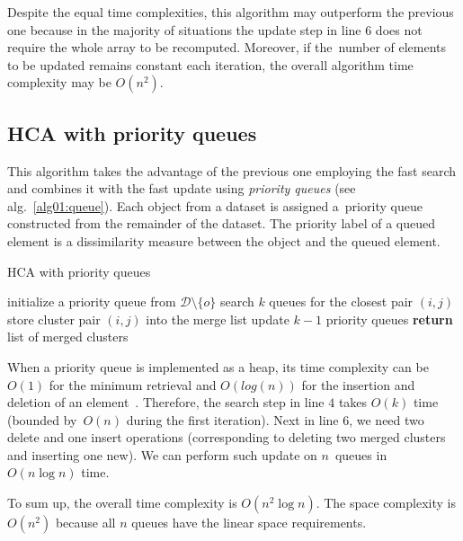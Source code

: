 Despite the equal time complexities, this algorithm may outperform the previous one because in the majority of situations the update step in line $6$ does not require the whole array to be recomputed. Moreover, if the~number of elements to be updated remains constant each iteration, the overall algorithm time complexity may be $O(n^2)$. 

\subsection{HCA with priority queues}

This algorithm takes the advantage of the previous one employing the fast search and combines it with the fast update using \emph{priority queues} (see alg.~\ref{alg01:queue}).
Each object from a dataset is assigned a~priority queue constructed from the remainder of the dataset. The priority label of a queued element is a dissimilarity measure between the object and the queued element. 

\begin{algorithm}[t]
 	\caption{HCA with priority queues}
 	\label{alg01:queue}
 	\begin{algorithmic}[1]
 		\State initialize a priority queue from $\mathcal{D} \setminus \{o\}$
 		\EndFor
 		\State search $k$ queues for the closest pair $(i,j)$ 
 		\State store cluster pair $(i,j)$ into the merge list 
 		\State update $k-1$ priority queues 
 		\EndFor
 		\State \textbf{return} list of merged clusters
 		\EndProcedure
 	\end{algorithmic}
\end{algorithm}

When a priority queue is implemented as a heap, its time complexity can be $O(1)$ for the minimum retrieval and $O(log(n))$ for the insertion and deletion of an element~\cite{fredman1987fibonacci}.
Therefore, the search step in line $4$ takes $O(k)$ time (bounded by~$O(n)$ during the first iteration). Next in line $6$, we need two delete and one insert operations (corresponding to deleting two merged clusters and inserting one new). We can perform such update on $n$~queues in $O(n\log{n})$ time.

To sum up, the overall time complexity is $O(n^2\log{n})$. The space complexity is $O(n^2)$ because all $n$ queues have the linear space requirements.

